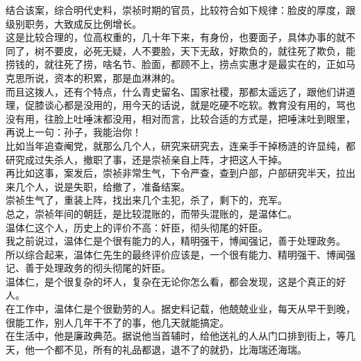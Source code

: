 \begin{multicols}{\theparacolNo}
结合该案，综合明代史料，崇祯时期的官员，比较符合如下规律：脸皮的厚度，跟级别职务，大致成反比例增长。\\

这是比较合理的，位高权重的，几十年下来，有身份，也要面子，具体办事的就不同了，树不要皮，必死无疑，人不要脸，天下无敌，好欺负的，就往死了欺负，能捞钱的，就往死了捞，啥名节、脸面，都顾不上，捞点实惠才是最实在的，正如马克思所说，资本的积累，那是血淋淋的。\\

而且这拨人，还有个特点，什么青史留名、国家社稷，那都太遥远了，跟他们讲道理，促膝谈心都是没用的，用今天的话说，就是吃硬不吃软。教育没有用的，骂也没有用，往脸上吐唾沫都没用，相对而言，比较合适的方式是，把唾沫吐到眼里，再说上一句：孙子，我能治你！\\

比如当年追查阉党，就那么几个人，研究来研究去，连亲手干掉杨涟的许显纯，都研究成过失杀人，撤职了事，还是崇祯亲自上阵，才把这人干掉。\\

再比如这事，案发后，崇祯非常生气，下令严查，查到户部，户部研究半天，拉出来几个人，说是失职，给撤了，准备结案。\\

崇祯生气了，重装上阵，找出来几个主犯，杀了，剩下的，充军。\\

总之，崇祯年间的朝廷，是比较混账的，而带头混账的，是温体仁。\\

温体仁这个人，历史上的评价不高：奸臣，彻头彻尾的奸臣。\\

我之前说过，温体仁是个很有能力的人，精明强干，博闻强记，善于处理政务。\\

所以综合起来，温体仁先生的最终评价应该是，一个很有能力、精明强干、博闻强记、善于处理政务的彻头彻尾的奸臣。\\

温体仁，是个很复杂的坏人，复杂在无论你怎么看，都会发现，这是个真正的好人。\\

在工作中，温体仁是个很勤劳的人。据史料记载，他兢兢业业，每天从早干到晚，很能工作，别人几年干不了的事，他几天就能搞定。\\

在生活中，他是廉政典范。据说他当首辅时，给他送礼的人从门口排到街上，等几天，他一个都不见，所有的礼品都退，退不了的就扔，比海瑞还海瑞。\\


\end{multicols}
